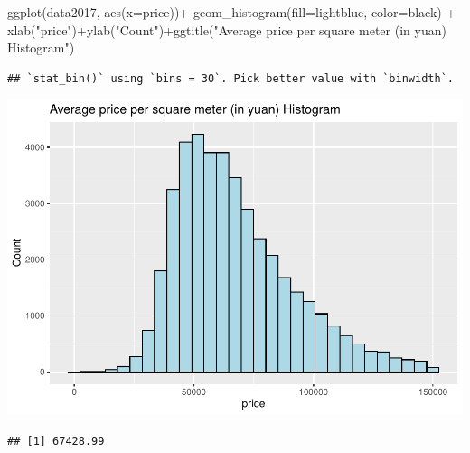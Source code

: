 \documentclass[
]{article}
\newenvironment{Shaded}{\begin{snugshade}}{\end{snugshade}}
\newcommand{\AttributeTok}[1]{\textcolor[rgb]{0.77,0.63,0.00}{#1}}
\newcommand{\FunctionTok}[1]{\textcolor[rgb]{0.00,0.00,0.00}{#1}}
\newcommand{\NormalTok}[1]{#1}
\newcommand{\SpecialCharTok}[1]{\textcolor[rgb]{0.00,0.00,0.00}{#1}}
\newcommand{\StringTok}[1]{\textcolor[rgb]{0.31,0.60,0.02}{#1}}
\begin{document}
\begin{Shaded}
\begin{Highlighting}[]
\FunctionTok{ggplot}\NormalTok{(data2017, }\FunctionTok{aes}\NormalTok{(}\AttributeTok{x=}\NormalTok{price))}\SpecialCharTok{+}
  \FunctionTok{geom\_histogram}\NormalTok{(}\AttributeTok{fill=}\StringTok{\textquotesingle{}lightblue\textquotesingle{}}\NormalTok{, }\AttributeTok{color=}\StringTok{\textquotesingle{}black\textquotesingle{}}\NormalTok{) }\SpecialCharTok{+}
  \FunctionTok{xlab}\NormalTok{(}\StringTok{"price"}\NormalTok{)}\SpecialCharTok{+}\FunctionTok{ylab}\NormalTok{(}\StringTok{"Count"}\NormalTok{)}\SpecialCharTok{+}\FunctionTok{ggtitle}\NormalTok{(}\StringTok{"Average price per square meter (in yuan) Histogram"}\NormalTok{)}
\end{Highlighting}
\end{Shaded}

\begin{verbatim}
## `stat_bin()` using `bins = 30`. Pick better value with `binwidth`.
\end{verbatim}

\includegraphics{Project_files/figure-latex/unnamed-chunk-16-1.pdf}

\begin{Shaded}
\end{Shaded}

\begin{verbatim}
## [1] 67428.99
\end{verbatim}
\end{document}
